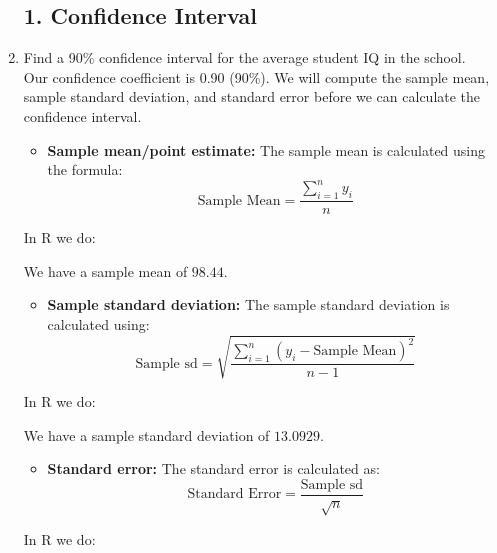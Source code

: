 \documentclass[12pt,letterpaper]{article}
\begin{document}
	\begin{enumerate}
		
		\subsection*{1. Confidence Interval}
		
		\item Find a 90\% confidence interval for the average student IQ in the school.\\
		
		Our confidence coefficient is 0.90 (90\%). We will compute the sample mean, sample standard deviation, and standard error before we can calculate the confidence interval.
		
		\begin{itemize}
			\item \textbf{Sample mean/point estimate:} The sample mean is calculated using the formula:
			\[
			\text{Sample Mean} = \frac{\sum_{i=1}^{n} y_i}{n}
			\]
		\end{itemize}
		
		In R we do:
		
		
		We have a sample mean of \(98.44\). 
		
		\begin{itemize}
			\item \textbf{Sample standard deviation:} The sample standard deviation is calculated using:
			\[
			\text{Sample sd} = \sqrt{\frac{\sum_{i=1}^{n} (y_i - \text{Sample Mean})^2}{n-1}}
			\]
		\end{itemize}
		
		In R we do:
		
		
		We have a sample standard deviation of \(13.0929\). 
		
		\begin{itemize}
			\item \textbf{Standard error:} The standard error is calculated as:
			\[
			\text{Standard Error} = \frac{\text{Sample sd}}{\sqrt{n}}
			\]
		\end{itemize}
		
		In R we do:
		
		

\end{enumerate}
\end{document}
